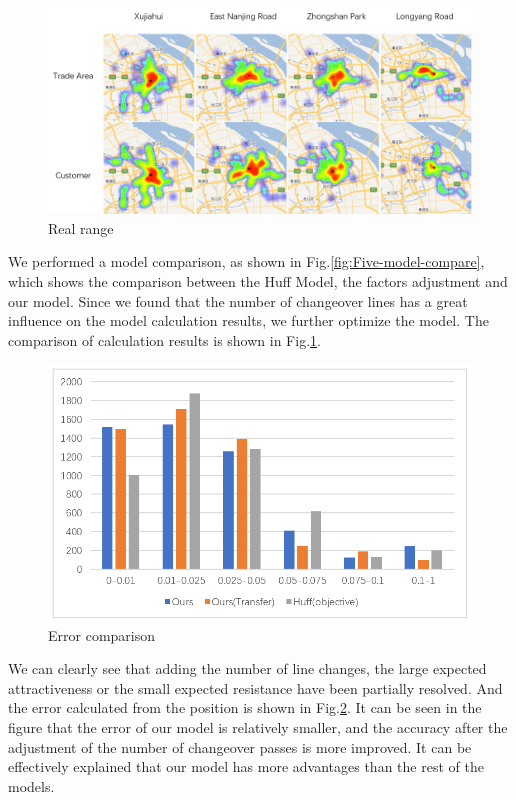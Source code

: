 \documentclass[journal]{IEEEtran}
\begin{document}
\begin{figure}[tb]
\centering
\includegraphics[width=1\columnwidth]{figure11.png}
\caption{Real range}
\label{fig:Real-range}
\end{figure}

We performed a model comparison, as shown in Fig.\ref{fig:Five-model-compare}, which shows the comparison between the Huff Model, the factors adjustment and our model. Since we found that the number of changeover lines has a great influence on the model calculation results, we further optimize the model. The comparison of calculation results is shown in Fig.\ref{fig:Real-range}.

\begin{figure}[tb]
\centering
\includegraphics[width=1\columnwidth]{figure12.png}
\caption{Error comparison}
\label{fig:Error-comparison}
\end{figure}

We can clearly see that adding the number of line changes, the large expected attractiveness or the small expected resistance have been partially resolved. And the error calculated from the position is shown in Fig.\ref{fig:Error-comparison}. It can be seen in the figure that the error of our model is relatively smaller, and the accuracy after the adjustment of the number of changeover passes is more improved. It can be effectively explained that our model has more advantages than the rest of the models.
\end{document}
